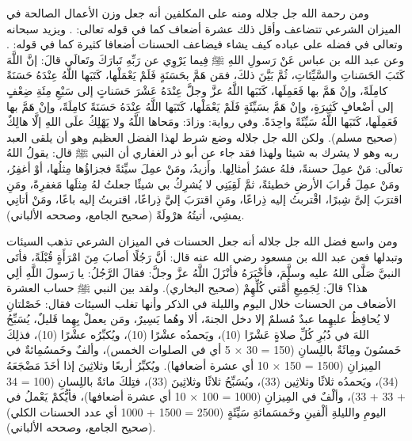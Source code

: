 ومن رحمة الله جل جلاله ومنه على المكلفين أنه جعل وزن الأعمال الصالحة في الميزان الشرعي تتضاعف وأقل ذلك عشرة أضعاف كما في قوله تعالى: 
\quranayah*[6][160]{\footnotesize \surahname*[6]}. ويزيد سبحانه وتعالى في فضله على عباده كيف يشاء فيضاعف الحسنات أضعافا كثيرة كما في قوله: 
\quranayah*[2][245]{\footnotesize \surahname*[2]}.
وعن عبد الله بن عباس عَنْ رَسولِ اللهِ ﷺ فِيما يَرْوِي عن رَبِّهِ تَبارَكَ وتَعالَى قالَ: إنَّ اللَّهَ كَتَبَ الحَسَناتِ والسَّيِّئاتِ، ثُمَّ بَيَّنَ ذلكَ، فمَن هَمَّ بحَسَنَةٍ فَلَمْ يَعْمَلْها، كَتَبَها اللَّهُ عِنْدَهُ حَسَنَةً كامِلَةً، وإنْ هَمَّ بها فَعَمِلَها، كَتَبَها اللَّهُ عزَّ وجلَّ عِنْدَهُ عَشْرَ حَسَناتٍ إلى سَبْعِ مِئَةِ ضِعْفٍ إلى أضْعافٍ كَثِيرَةٍ، وإنْ هَمَّ بسَيِّئَةٍ فَلَمْ يَعْمَلْها، كَتَبَها اللَّهُ عِنْدَهُ حَسَنَةً كامِلَةً، وإنْ هَمَّ بها فَعَمِلَها، كَتَبَها اللَّهُ سَيِّئَةً واحِدَةً. وفي رواية: وزادَ: ومَحاها اللَّهُ ولا يَهْلِكُ علَى اللهِ إلَّا هالِكٌ {\footnotesize (صحيح مسلم)}. ولكن الله جل جلاله وضع شرط لهذا الفضل العظيم وهو أن يلقى العبد ربه وهو لا يشرك به شيئا ولهذا فقد جاء عن أبو ذر الغفاري أن النبي ﷺ قال: يقولُ اللهُ تعالَى: مَنْ عمِلَ حسنةً، فلهُ عشرُ أمثالِها. وأَزيدُ، ومَنْ عمِلَ سيِّئةً فجزاؤُها مِثلُها، أوْ أغفِرُ، ومَنْ عمِلَ قُرابَ الأرضِ خطيئةً، ثمَّ لَقِيَنِي لا يُشرِكُ بي شيئًا جعلتُ لهُ مِثلَها مَغفرِةً، ومَنِ اقترَبَ إلىَّ شِبرًا، اقْتربتُ إليه ذِراعًا، ومَنِ اقترَبَ إليَّ ذِراعًا، اقتربتُ إليه باعًا، ومَنْ أتانِي يمشِي، أتيتُهُ هرْولَةً {\footnotesize (صحيح الجامع، وصححه الألباني)}.

ومن واسع فضل الله جل جلاله أنه جعل الحسنات في الميزان الشرعي تذهب السيئات وتبدلها فعن عبد الله بن مسعود رضي الله عنه قال: أنَّ رَجُلًا أصابَ مِنَ امْرَأَةٍ قُبْلَةً، فأتَى النبيَّ صَلَّى اللهُ عليه وسلَّمَ، فأخْبَرَهُ فأنْزَلَ اللَّهُ عزَّ وجلَّ: \quranayah*[11][114]{\footnotesize \surahname*[11]} فقالَ الرَّجُلُ: يا رَسولَ اللَّهِ ألِي هذا؟ قالَ: لِجَمِيعِ أُمَّتي كُلِّهِمْ {\footnotesize (صحيح البخاري)}. ولقد بين النبي ﷺ حساب العشرة الأضعاف من الحسنات خلال اليوم والليلة في الذكر وأنها تغلب السيئات فقال: خَصْلتانِ لا يُحافِظُ عليهِما عبدٌ مُسلمٌ إلا دخل الجنةَ، ألا وهُما يَسِيرٌ، ومَن يعملْ بِهِما قَليلٌ، يُسَبِّحُ اللهَ في دُبُرِ كُلِّ صلاةٍ عَشْرًا (10)، ويَحمدُه عشْرًا (10)، ويُكبِّرُه عشْرًا (10)، فذلِكَ خَمسُونَ ومِائَةٌ باللِسانِ (150 = 30 × 5 أي في الصلوات الخمس)، وألفٌ وخَمسُمِائةٌ في المِيزانِ (1500 = 150 × 10 أي عشرة أضعافها). ويُكبِّرُ أربعًا وثلاثِينَ إذا أخَذَ مَضْجَعَهُ (34)، ويَحمدُه ثلاثًا وثلاثِين (33)، ويُسَبِّحُ ثلاثًا وثلاثِينَ (33)، فتِلكَ مائةٌ باللِسانِ (100 = 34 + 33 + 33)، وألْفٌ في المِيزانِ (1000 = 100 × 10 أي عشرة أضعافها)، فأيُّكمْ يَعْملُ في اليومِ والليلةِ ألْفينِ وخَمسَمائةِ سَيِّئَةٍ (2500 = 1500 + 1000 أي عدد الحسنات الكلي) {\footnotesize (صحيح الجامع، وصححه الألباني)}. 

